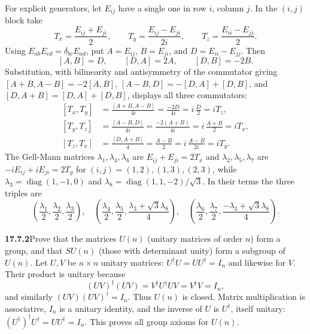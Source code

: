 For explicit generators, let $E_{ij}$ have a single one in row
$i$, column $j$. In the $(i,j)$ block take
\[
T_x=\frac{E_{ij}+E_{ji}}2,\qquad
T_y=\frac{E_{ij}-E_{ji}}{2i},\qquad
T_z=\frac{E_{ii}-E_{jj}}2.
\]
Using $E_{ab}E_{cd}=\delta_{bc}E_{ad}$, put
$A=E_{ij}$, $B=E_{ji}$, and $D=E_{ii}-E_{jj}$.
Then
\[
[A,B]=D,\qquad [D,A]=2A,\qquad[D,B]=-2B.
\]
Substitution, with bilinearity and antisymmetry of the commutator
giving $[A+B,A-B]=-2[A,B]$,
$[A-B,D]=-[D,A]+[D,B]$, and $[D,A+B]=[D,A]+[D,B]$,
displays all three commutators:
\[
\begin{aligned}
{}[T_x,T_y]&=\frac{[A+B,A-B]}{4i}
=\frac{-2D}{4i}=i\,\frac D2=iT_z,\\
[T_y,T_z]&=\frac{[A-B,D]}{4i}
=\frac{-2(A+B)}{4i}=i\,\frac{A+B}{2}=iT_x,\\
[T_z,T_x]&=\frac{[D,A+B]}4
=\frac{A-B}{2}=i\,\frac{A-B}{2i}=iT_y.
\end{aligned}
\]
The Gell-Mann matrices $\lambda_1,\lambda_4,\lambda_6$ are
$E_{ij}+E_{ji}=2T_x$ and $\lambda_2,\lambda_5,\lambda_7$ are
$-iE_{ij}+iE_{ji}=2T_y$ for $(i,j)=(1,2),(1,3),(2,3)$, while
$\lambda_3=\operatorname{diag}(1,-1,0)$ and
$\lambda_8=\operatorname{diag}(1,1,-2)/\sqrt3$. In their terms the
three triples are
\[
\left(\frac{\lambda_1}2,\frac{\lambda_2}2,\frac{\lambda_3}2\right),
\quad
\left(\frac{\lambda_4}2,\frac{\lambda_5}2,
\frac{\lambda_3+\sqrt3\lambda_8}{4}\right),
\quad
\left(\frac{\lambda_6}2,\frac{\lambda_7}2,
\frac{-\lambda_3+\sqrt3\lambda_8}{4}\right).
\]

\par\bigskip
\noindent\textbf{17.7.2}\quad Prove that the matrices $U(n)$
(unitary matrices of order $n$) form a group, and that $SU(n)$ (those
with determinant unity) form a subgroup of $U(n)$.
\solution
Let $U,V$ be $n\times n$ unitary matrices:
$U^\dagger U=UU^\dagger=I_n$ and likewise for $V$.
Their product is unitary because
\[
(UV)^\dagger(UV)=V^\dagger U^\dagger UV
=V^\dagger V=I_n,
\]
and similarly $(UV)(UV)^\dagger=I_n$. Thus $U(n)$ is closed.
Matrix multiplication is associative, $I_n$ is a unitary identity,
and the inverse of $U$ is $U^\dagger$, itself unitary:
$(U^\dagger)^\dagger U^\dagger=UU^\dagger=I_n$.
This proves all group axioms for $U(n)$.

